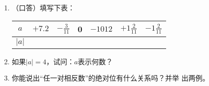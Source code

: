 \begin{ex}
	\begin{enumerate}
		\item （口答）填写下表：
		\begin{center}
			\begin{tabular}{c|cccccc}
				\hline
				$a$ & $+7.2$ & $-\frac{3}{11}$ & 0& $-1012$ &$+1\frac{2}{11}$ &$-1\frac{2}{11}$\\
				\hline
				$|a|$\\
				\hline
			\end{tabular}       
		\end{center}
		\item 如果$|a|=4$，试问：$a$表示何数？
		\item 你能说出“任一对相反数”的绝对位有什么关系吗？并举
		出两例。
	\end{enumerate}
\end{ex}

